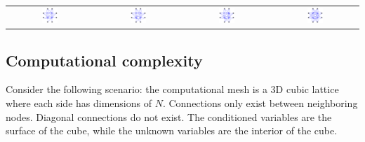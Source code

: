 \documentclass{article}
\begin{document}
\begin{center}
\begin{tabular}{cccc}
\parbox{0.2\textwidth}{\includegraphics[width = 0.2\textwidth]{example_straight_forwards_back_substitution/example_straight_forwards_back_substitution_panel_5}} 
& \parbox{0.2\textwidth}{\includegraphics[width = 0.2\textwidth]{example_straight_forwards_back_substitution/example_straight_forwards_back_substitution_panel_6}} 
& \parbox{0.2\textwidth}{\includegraphics[width = 0.2\textwidth]{example_straight_forwards_back_substitution/example_straight_forwards_back_substitution_panel_7}} 
& \parbox{0.2\textwidth}{\includegraphics[width = 0.2\textwidth]{example_straight_forwards_back_substitution/example_straight_forwards_back_substitution_panel_8}} 
\end{tabular}
\end{center}





\subsection{Computational complexity}

Consider the following scenario: the computational mesh is a 3D cubic lattice where each side has dimensions of \(N\). Connections only exist between neighboring nodes. Diagonal connections do not exist. The conditioned variables are the surface of the cube, while the unknown variables are the interior of the cube. 
\end{document}
